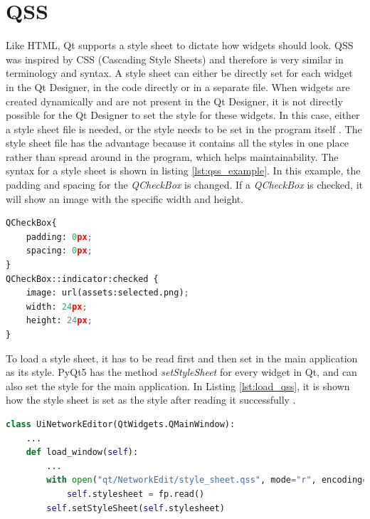 \section{QSS}
Like HTML, Qt supports a style sheet to dictate how widgets should look. QSS was inspired by CSS (Cascading Style Sheets) and therefore is very similar in terminology and syntax. A style sheet can either be directly set for each widget in the Qt Designer, in the code directly or in a separate file. When widgets are created dynamically and are not present in the Qt Designer, it is not directly possible for the Qt Designer to set the style for these widgets. In this case, either a style sheet file is needed, or the style needs to be set in the program itself \cite{qt}. The style sheet file has the advantage because it contains all the styles in one place rather than spread around in the program, which helps maintainability. The syntax for a style sheet is shown in listing \ref{lst:qss_example}. In this example, the padding and spacing for the \textit{QCheckBox} is changed. If a \textit{QCheckBox} is checked, it will show an image with the specific width and height.
\begin{lstlisting}[language=python, caption={QSS example}, label={lst:qss_example}]
QCheckBox{
    padding: 0px;
    spacing: 0px;
}
QCheckBox::indicator:checked {
    image: url(assets:selected.png);
    width: 24px;
    height: 24px;
}
\end{lstlisting}
To load a style sheet, it has to be read first and then set in the main application as its style. PyQt5 has the method \textit{setStyleSheet} for every widget in Qt, and can also set the style for the main application. In Listing \ref{lst:load_qss}, it is shown how the style sheet is set as the style after reading it successfully \cite{pyqt}.\begin{lstlisting}[language=python, caption={Loading of the QSS}, label={lst:load_qss}]
class UiNetworkEditor(QtWidgets.QMainWindow):
    ...
    def load_window(self):
        ...
        with open("qt/NetworkEdit/style_sheet.qss", mode="r", encoding="utf-8") as fp:
            self.stylesheet = fp.read()
        self.setStyleSheet(self.stylesheet)
\end{lstlisting}



